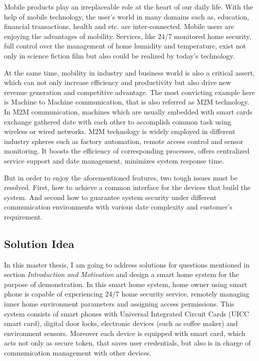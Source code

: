 \documentclass[]{llncs}
\begin{document}
Mobile products  play an irreplaceable role at the heart of our  daily life. With the help of mobile technology, the user's world in many domains such as, education, financial transactions, health and etc. are inter-connected. Mobile users are enjoying the advantages of mobility. Services, like 24/7 monitored home security, full control over the management of home humidity and temperature, exist not only in science fiction film but also could be realized by today's technology.

At the same time, mobility in industry and business world is also a critical  assert, which can not only increase efficiency and productivity but also drive new revenue generation and competitive advantage. The most convicting example here is Machine to Machine communication, that is also referred as M2M technology. In M2M communication, machines which are usually embedded with smart cards exchange gathered date with each other to accomplish common task using wireless or wired networks. M2M technology is widely employed in different industry spheres such as factory automation, remote access control and sensor monitoring. It boosts the efficiency of corresponding processes, offers centralized service support and date management, minimizes system response time.

But in order to enjoy the aforementioned features, two tough issues must be resolved. First, how to achieve a common interface for the devices that build the system.  And second how to guarantee system security under different communication environments with various date complexity and customer's requirement.

\subsection{Solution Idea}
In this master thesis, I am going to address solutions for questions mentioned in  section \emph{Introduction and Motivation} and  design a smart home system for the purpose of demonstration. In this smart home system, home owner using smart phone is capable of experiencing 24/7 home security service, remotely managing inner home environment parameters and assigning access permissions. This system consists of smart phones with Universal Integrated Circuit Cards (UICC  smart card), digital door locks, electronic devices (such as coffee maker) and environment sensors. Moreover each device is equipped with smart card, which acts not only as secure token, that saves  user credentials, but also is in charge of communication management with other devices.
\end{document}
